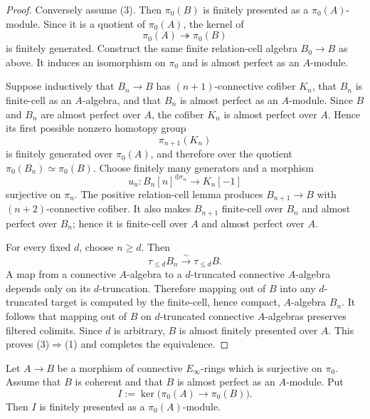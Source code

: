 \begin{proof}
Conversely assume (3).  Then $\pi_0(B)$ is finitely presented as a
$\pi_0(A)$-module.  Since it is a quotient of $\pi_0(A)$, the kernel of
\[
    \pi_0(A)\twoheadrightarrow\pi_0(B)
\]
is finitely generated.  Construct the same finite relation-cell algebra
$B_0\to B$ as above.  It induces an isomorphism on $\pi_0$ and is almost
perfect as an $A$-module.

Suppose inductively that $B_n\to B$ has $(n+1)$-connective cofiber $K_n$, that
$B_n$ is finite-cell as an $A$-algebra, and that $B_n$ is almost perfect as an
$A$-module.  Since $B$ and $B_n$ are almost perfect over $A$, the cofiber
$K_n$ is almost perfect over $A$.  Hence its first possible nonzero homotopy
group
\[
    \pi_{n+1}(K_n)
\]
is finitely generated over $\pi_0(A)$, and therefore over the quotient
$\pi_0(B_n)\simeq\pi_0(B)$.  Choose finitely many generators and a morphism
\[
    u_n:B_n[n]^{\oplus r_n}\longrightarrow K_n[-1]
\]
surjective on $\pi_n$.  The positive relation-cell lemma produces
$B_{n+1}\to B$ with $(n+2)$-connective cofiber.  It also makes
$B_{n+1}$ finite-cell over $B_n$ and almost perfect over $B_n$; hence it is
finite-cell over $A$ and almost perfect over $A$.

For every fixed $d$, choose $n\geq d$.  Then
\[
    \tau_{\leq d}B_n
    \xrightarrow{\sim}
    \tau_{\leq d}B.
\]
A map from a connective $A$-algebra to a $d$-truncated connective
$A$-algebra depends only on its $d$-truncation.  Therefore mapping out of $B$
into any $d$-truncated target is computed by the finite-cell, hence compact,
$A$-algebra $B_n$.  It follows that mapping out of $B$ on $d$-truncated
connective $A$-algebras preserves filtered colimits.  Since $d$ is arbitrary,
$B$ is almost finitely presented over $A$.  This proves (3)$\Rightarrow$(1)
and completes the equivalence.
\end{proof}

\begin{lemma}
\label{lem:bnla-augmentation-ideal-finite-presentation}
Let $A\to B$ be a morphism of connective $E_\infty$-rings which is
surjective on $\pi_0$.  Assume that $B$ is coherent and that $B$ is almost
perfect as an $A$-module.  Put
\[
    I:=\ker\bigl(\pi_0(A)\to\pi_0(B)\bigr).
\]
Then $I$ is finitely presented as a $\pi_0(A)$-module.
\end{lemma}

